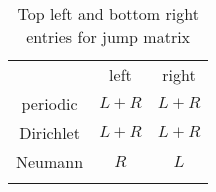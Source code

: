 \begin{longtable}{ccc}
  \toprule
 & left & right \\ 
periodic & $L+R$ & $L+R$ \\ 
Dirichlet & $L+R$ & $L+R$ \\
Neumann & $R$ & $L$ \\
\bottomrule
\caption{Top left and bottom right entries for jump matrix}
\label{tab:jump_terms}
\end{longtable}
